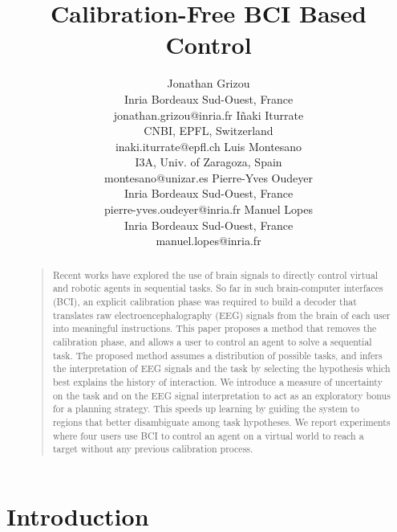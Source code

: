 \documentclass[letterpaper]{article}
\begin{document}
\title{Calibration-Free BCI Based Control}
\author{Jonathan Grizou \\ Inria Bordeaux Sud-Ouest, France \\ jonathan.grizou@inria.fr
\And I\~naki Iturrate \\ CNBI, EPFL, Switzerland \\ inaki.iturrate@epfl.ch
\AND Luis Montesano \\ I3A, Univ. of Zaragoza, Spain \\ montesano@unizar.es
\And Pierre-Yves Oudeyer \\ Inria Bordeaux Sud-Ouest, France \\ pierre-yves.oudeyer@inria.fr
\And Manuel Lopes \\ Inria Bordeaux Sud-Ouest, France \\ manuel.lopes@inria.fr}

\maketitle

\begin{abstract}
\begin{quote}
Recent works have explored the use of brain signals to directly control virtual and robotic agents in sequential tasks. So far in such brain-computer interfaces (BCI), an explicit calibration phase was required to build a decoder that translates raw electroencephalography (EEG) signals from the brain of each user into meaningful instructions.
%
This paper proposes a method that removes the calibration phase, and allows a user to control an agent to solve a sequential task.
%
The proposed method assumes a distribution of possible tasks, and infers the interpretation of EEG signals and the task by selecting the hypothesis which best explains the history of interaction. 
%
We introduce a measure of uncertainty on the task and on the EEG signal interpretation to act as an exploratory bonus for a planning strategy. This speeds up learning by guiding the system to regions that better disambiguate among task hypotheses.
%
We report experiments where four users use BCI to control an agent on a virtual world to reach a target without any previous calibration process.
\end{quote}
\end{abstract}

\section{Introduction}
\end{document}
